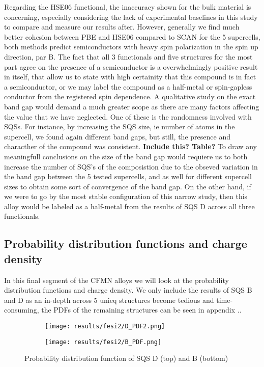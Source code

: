 Regarding the HSE06 functional, the inaccuracy shown for the bulk material is concerning, especially considering the lack of experimental baselines in this study to compare and measure our results after. However, generally we find much better cohesion between PBE and HSE06 compared to SCAN for the 5 supercells, both methods predict semiconductors with heavy spin polarization in the spin up direction, par B. The fact that all 3 functionals and five structures for the most part agree on the presence of a semiconductor is a overwhelmingly positive result in itself, that allow us to state with high certainity that this compound is in fact a semiconductor, or we may label the compound as a half-metal or spin-gapless conductor from the registered spin dependence. A qualitative study on the exact band gap would demand a much greater scope as there are many factors affecting the value that we have neglected. One of these is the randomness involved with SQSs. For instance, by increasing the SQS size, ie number of atoms in the supercell, we found again different band gaps, but still, the presence and characther of the compound was consistent. \textbf{Include this? Table?} To draw any meaningfull conclusions on the size of the band gap would requiere us to both increase the number of SQS's of the composistion due to the obseved variation in the band gap between the 5 tested supercells, and as well for different supercell sizes to obtain some sort of convergence of the band gap. On the other hand, if we were to go by the most stable configuration of this narrow study, then this alloy would be labeled as a half-metal from the results of SQS D across all three functionals.  

\subsection{Probability distribution functions and charge density}

In this final segment of the CFMN alloys we will look at the probability distribution functions and charge density. We only include the results of SQS B and D as an in-depth across 5 unieq structures become tedious and time-consuming, the PDFs of the remaining structures can be seen in appendix .. 
 
\begin{figure}[H]
	\centering
	\begin{subfigure}{\textwidth}
		\texttt{[image: results/fesi2/D\_PDF2.png]}
	\end{subfigure}
	\begin{subfigure}{\textwidth}
		\texttt{[image: results/fesi2/B\_PDF.png]}
	\end{subfigure}
	\caption{Probability distribution function of SQS D (top) and B (bottom)}
\end{figure}

